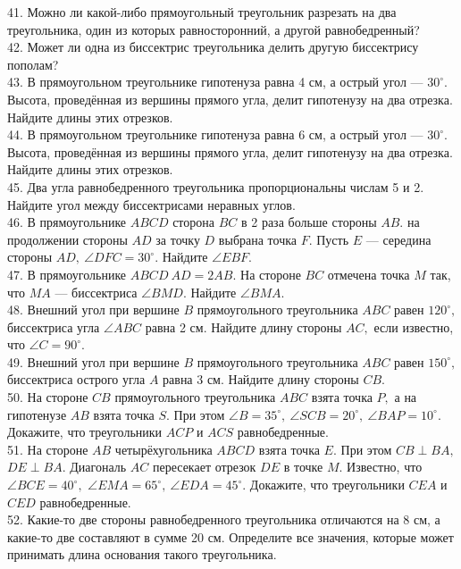 \documentclass[12pt]{article}
\begin{document}
41. Можно ли какой-либо прямоугольный треугольник разрезать на два треугольника, один из которых равносторонний, а другой равнобедренный?\\
42. Может ли одна из биссектрис треугольника делить другую биссектрису пополам?\\
43. В прямоугольном треугольнике гипотенуза равна 4 см, а острый угол --- $30^\circ.$ Высота, проведённая из вершины прямого угла, делит гипотенузу на два отрезка. Найдите длины этих отрезков.\\
44. В прямоугольном треугольнике гипотенуза равна 6 см, а острый угол --- $30^\circ.$ Высота, проведённая из вершины прямого угла, делит гипотенузу на два отрезка. Найдите длины этих отрезков.\\
45. Два угла равнобедренного треугольника пропорциональны числам 5 и 2. Найдите угол между биссектрисами неравных углов.\\
46. В прямоугольнике $ABCD$ сторона $BC$ в 2 раза больше стороны $AB.$ на продолжении стороны $AD$ за точку $D$ выбрана точка $F.$ Пусть $E$ --- середина стороны $AD,\ \angle DFC=30^\circ.$ Найдите $\angle EBF.$\\
47. В прямоугольнике $ABCD\ AD=2AB.$ На стороне $BC$ отмечена точка $M$ так, что $MA$ --- биссектриса $\angle BMD.$ Найдите $\angle BMA.$\\
48. Внешний угол при вершине $B$ прямоугольного треугольника $ABC$ равен $120^\circ,$ биссектриса угла $\angle ABC$ равна 2 см. Найдите длину стороны $AC,$ если известно, что $\angle C=90^\circ.$\\
49. Внешний угол при вершине $B$ прямоугольного треугольника $ABC$ равен $150^\circ,$ биссектриса острого угла $A$ равна 3 см. Найдите длину стороны $CB.$\\
50. На стороне $CB$ прямоугольного треугольника $ABC$ взята точка $P,$ а на гипотенузе $AB$ взята точка $S.$ При этом $\angle B=35^\circ,\ \angle SCB=20^\circ,\ \angle BAP=10^\circ.$ Докажите, что треугольники $ACP$ и $ACS$ равнобедренные.\\
51. На стороне $AB$ четырёхугольника $ABCD$ взята точка $E.$ При этом $CB\perp BA,$ $DE\perp BA.$ Диагональ $AC$ пересекает отрезок $DE$ в точке $M.$ Известно, что
$\angle BCE=40^\circ,$ $\angle EMA=65^\circ,\ \angle EDA=45^\circ.$ Докажите, что треугольники $CEA$ и $CED$ равнобедренные.\\
52. Какие-то две стороны равнобедренного треугольника отличаются на 8 см, а какие-то две составляют в сумме 20 см. Определите все значения, которые может принимать длина основания такого треугольника.\\
\end{document}
